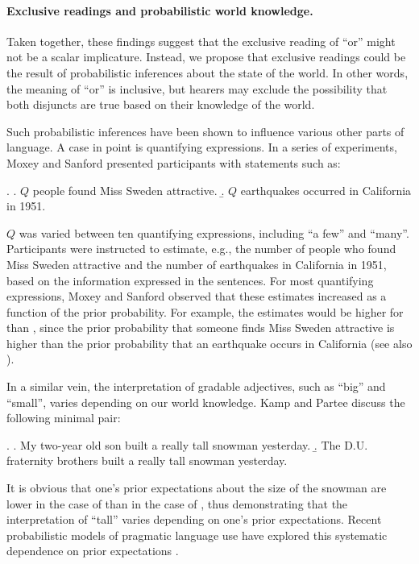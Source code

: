\documentclass[12pt]{article}
\begin{document}
\paragraph{Exclusive readings and probabilistic world knowledge.} Taken together, these findings
suggest that the exclusive reading of ``or'' might not be a scalar implicature. Instead, we
propose that exclusive readings could be the result of probabilistic inferences about the state
of the world. In other words, the meaning of ``or'' is inclusive, but hearers may exclude the
possibility that both disjuncts are true based on their knowledge of the world.

Such probabilistic inferences have been shown to influence various other parts of language. A case in point is quantifying expressions. In a series of experiments, Moxey and Sanford \citeyearpar{moxey1993} presented participants with statements such as:

\ex.	\a. $Q$ people found Miss Sweden attractive.
	\b. $Q$ earthquakes occurred in California in 1951.
	
$Q$ was varied between ten quantifying expressions, including ``a few'' and ``many''. Participants were instructed to estimate, e.g., the number of people who found Miss Sweden attractive and the number of earthquakes in California in 1951, based on the information expressed in the sentences. For most quantifying expressions, Moxey and Sanford observed that these estimates increased as a function of the prior probability. For example, the estimates would be higher for \Last[a] than \Last[b], since the prior probability that someone finds Miss Sweden attractive is higher than the prior probability that an earthquake occurs in California (see also \citealt{pepper1974}).

In a similar vein, the interpretation of gradable adjectives, such as ``big'' and ``small'', varies depending on our world knowledge. Kamp and Partee \citeyearpar{kamp1995} discuss the following minimal pair:

\ex.	\a. My two-year old son built a really tall snowman yesterday.
	\b. The D.U. fraternity brothers built a really tall snowman yesterday.
	
It is obvious that one's prior expectations about the size of the snowman are lower in the case
of \Last[a] than in the case of \Last[b], thus demonstrating that the interpretation of ``tall''
varies depending on one's prior expectations. Recent probabilistic models of pragmatic language
use have explored this systematic dependence on prior expectations
\citep[cf.,][]{LassiterGoodman2015:Adjectival-vagu,QingFranke2014:Gradable-Adject,SchollerFranke2015:Semantic-values}.
\end{document}
